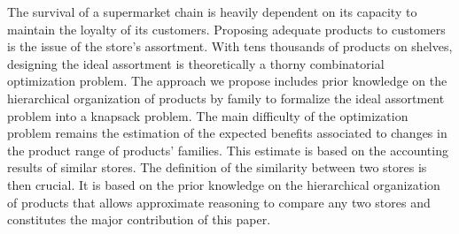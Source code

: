 
The survival of a supermarket chain is heavily dependent on its capacity to maintain the loyalty of its customers. Proposing adequate products to customers is the issue of the store's assortment. With tens thousands of products on shelves, designing the ideal assortment is theoretically a thorny combinatorial optimization problem. The approach we propose includes prior knowledge on the hierarchical organization of products by family to formalize the ideal assortment problem into a knapsack problem. The main difficulty of the optimization problem remains the estimation of the expected benefits associated to changes in the product range of products' families. This estimate is based on the accounting results of similar stores. The definition of the similarity between two stores is then crucial. It is based on the prior knowledge on the hierarchical organization of products that allows approximate reasoning to compare any two stores and constitutes the major contribution of this paper.

